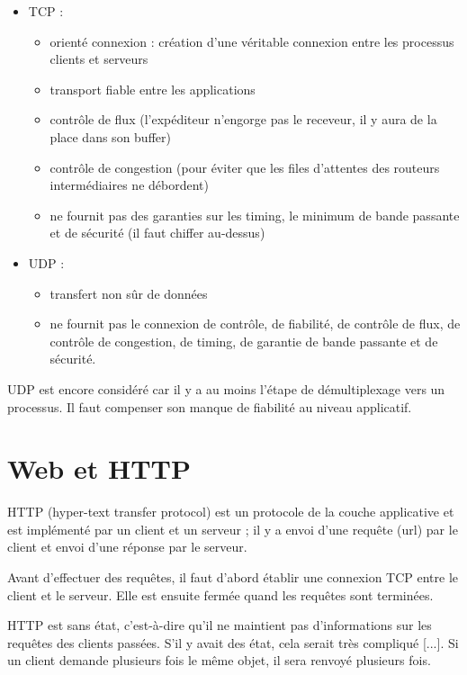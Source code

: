 		\begin{itemize}
			\item TCP : 
			\begin{itemize}
				\item orienté connexion : création d'une véritable connexion entre les processus clients et serveurs
				\item transport fiable entre les applications
				\item contrôle de flux (l'expéditeur n'engorge pas le receveur, il y aura de la place dans son buffer)
				\item contrôle de congestion (pour éviter que les files d'attentes des routeurs intermédiaires ne débordent)
				\item ne fournit pas des garanties sur les timing, le minimum de bande passante et de sécurité (il faut chiffer au-dessus)
			\end{itemize}
			
			\item UDP :
			
			\begin{itemize}
				\item transfert non sûr de données
				\item ne fournit pas le connexion de contrôle, de fiabilité, de contrôle de flux, de contrôle de congestion, de timing, de garantie de bande passante et de sécurité.
			\end{itemize}
		\end{itemize}
		
		UDP est encore considéré car il y a au moins l'étape de démultiplexage vers un processus. Il faut compenser son manque de fiabilité au niveau applicatif.

\section{Web et HTTP}

HTTP (hyper-text transfer protocol) est un protocole de la couche applicative et est implémenté par un client et un serveur ; il y a envoi d'une requête (url) par le client et envoi d'une réponse par le serveur.

Avant d'effectuer des requêtes, il faut d'abord établir une connexion TCP entre le client et le serveur. Elle est ensuite fermée quand les requêtes sont terminées.

HTTP est sans état, c'est-à-dire qu'il ne maintient pas d'informations sur les requêtes des clients passées. S'il y avait des état, cela serait très compliqué [...]. Si un client demande plusieurs fois le même objet, il sera renvoyé plusieurs fois.


